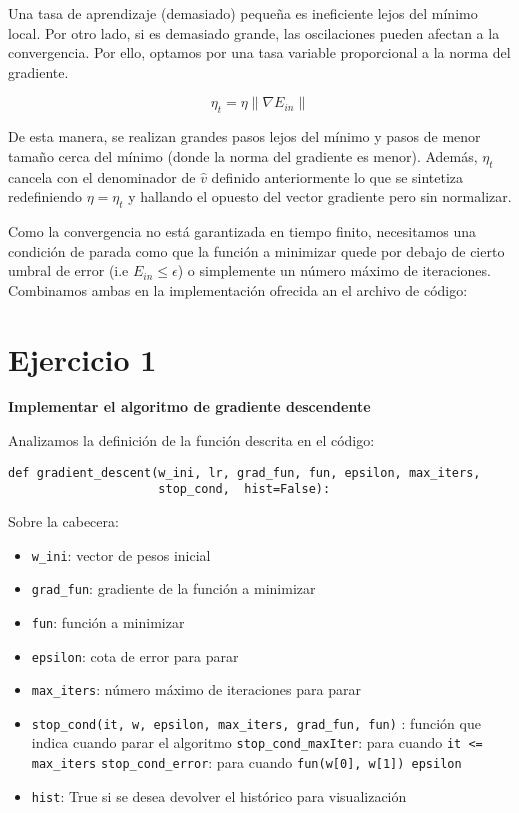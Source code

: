Una tasa de aprendizaje (demasiado) pequeña es ineficiente lejos del mínimo local. 
Por otro lado, si es demasiado grande, las oscilaciones pueden afectan a la convergencia.
Por ello, optamos por una tasa variable proporcional a la norma del gradiente.

\begin{equation*}
  \eta_t = \eta \lVert \nabla E_{in} \rVert
\end{equation*}

De esta manera, se realizan grandes pasos lejos del mínimo y pasos de menor tamaño
cerca del mínimo (donde la norma del gradiente es menor).
Además, $\eta_t$ cancela con el denominador de $\hat{v}$ definido anteriormente lo que
se sintetiza redefiniendo $\eta = \eta_t$ y hallando el opuesto del vector gradiente 
pero sin normalizar.

Como la convergencia no está garantizada en tiempo finito, necesitamos una condición de
parada como que la función a minimizar quede por debajo de cierto umbral de
error (i.e $E_{in} \leq \epsilon$) o simplemente un número máximo de iteraciones.
Combinamos ambas en la implementación ofrecida an el archivo de código:

\section{Ejercicio 1}

\textbf{Implementar el algoritmo de gradiente descendente}

Analizamos la definición de la función descrita en el código:

\begin{verbatim}
def gradient_descent(w_ini, lr, grad_fun, fun, epsilon, max_iters, 
                     stop_cond,  hist=False):
\end{verbatim}

Sobre la cabecera:
\begin{itemize}
  \item \texttt{w_ini}: vector de pesos inicial
  \item \texttt{grad_fun}: gradiente de la función a minimizar
  \item \texttt{fun}: función a minimizar
  \item \texttt{epsilon}: cota de error para parar 
  \item \texttt{max_iters}: número máximo de iteraciones para parar
  \item \texttt{stop_cond(it, w, epsilon, max_iters, grad_fun, fun)}
    : función que indica cuando parar el algoritmo
    \subitem \texttt{stop_cond_maxIter}: para cuando \texttt{it <= max_iters}
    \subitem \texttt{stop_cond_error}: para cuando \texttt{fun(w[0], w[1]) \leq epsilon}
  \item \texttt{hist}: True si se desea devolver el histórico para visualización
\end{itemize}


